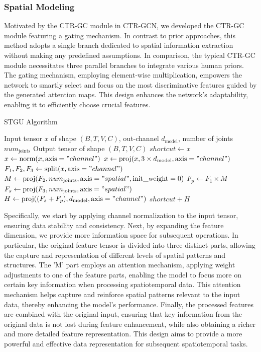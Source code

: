 \documentclass[conference,a4paper,english]{IEEEtran}[2015/08/26]
\begin{document}
\subsubsection{Spatial Modeling}
Motivated by the CTR-GC module in CTR-GCN, we developed the CTR-GC module featuring a gating mechanism. 
In contrast to prior approaches, this method adopts a single branch dedicated to spatial information 
extraction without making any predefined assumptions. In comparison, the typical CTR-GC module necessitates 
three parallel branches to integrate various human priors. The gating mechanism, employing element-wise
multiplication, empowers the network to smartly select and focus on the most discriminative features
guided by the generated attention maps. 
This design enhances the network's adaptability, enabling it to efficiently choose crucial features.

\begin{algorithm}
  \renewcommand{\algorithmicrequire}{\textbf{Input:}}
  \renewcommand{\algorithmicensure}{\textbf{Output:}}
  \caption{STGU Algorithm}
  \label{alg:stgu}
  \begin{algorithmic}[1]
    \REQUIRE Input tensor $x$ of shape $(B, T, V, C)$, out-channel $d_{\text{model}}$, number of joints $num_{\text{joints}}$
    \ENSURE Output tensor of shape $(B, T, V, C)$
    \STATE $shortcut \leftarrow x$
    \STATE $x \leftarrow \text{norm}(x, \text{axis}="channel")$
    \STATE $x \leftarrow \text{proj}(x, 3 \times d_{\text{model}}, \text{axis}="channel")$
    \STATE $F_1, F_2, F_3 \leftarrow \text{split}(x, \text{axis}="channel")$
    \STATE $M \leftarrow \text{proj}(F_2, num_{\text{joints}}, \text{axis}="spatial", \text{init\_weight}=0)$
    \STATE $F_p \leftarrow F_1 \times M$
    \STATE $F_s \leftarrow \text{proj}(F_3, num_{\text{joints}}, \text{axis}="spatial")$
    \STATE $H \leftarrow \text{proj}((F_s + F_p), d_{\text{model}}, \text{axis}="channel")$
    \RETURN $shortcut + H$
  \end{algorithmic}  
\end{algorithm}

Specifically, we start by applying channel normalization to the input tensor, 
ensuring data stability and consistency. Next, by expanding the feature dimension, 
we provide more information space for subsequent operations. In particular, the original feature tensor 
is divided into three distinct parts, allowing the capture and representation of different levels of 
spatial patterns and structures. The 'M' part employs an attention mechanism, applying weight adjustments 
to one of the feature parts, enabling the model to focus more on certain key information when processing 
spatiotemporal data. This attention mechanism helps capture and reinforce spatial patterns relevant to 
the input data, thereby enhancing the model's performance. Finally, the processed features are combined 
with the original input, ensuring that key information from the original data is not lost during feature 
enhancement, while also obtaining a richer and more detailed feature representation. This design 
aims to provide a more powerful and effective data representation for subsequent spatiotemporal tasks.
\end{document}
